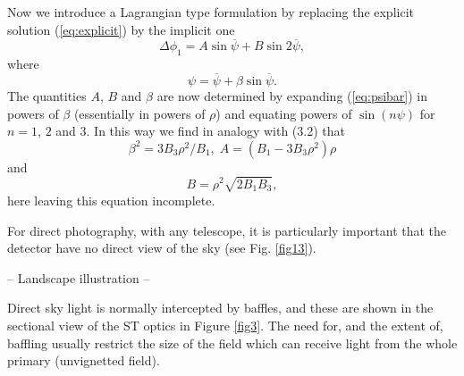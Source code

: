 Now we introduce a Lagrangian type formulation by replacing the
explicit solution (\ref{eq:explicit}) by the implicit one
\begin{equation}
\Delta \phi_1 = A \sin \overline{\psi} + B \sin 2 \overline{\psi},
\end{equation}
where
\begin{equation}
 \psi = \overline{\psi} + \beta \sin \overline{\psi}.
 \label{eq:psibar}
\end{equation}
The quantities $A$, $B$ and $\beta$ are now determined
by expanding (\ref{eq:psibar})
in powers of $\beta$ (essentially in powers of
$\rho$) and equating powers of $\sin (n \psi)$ for
$n = 1$, $2$ and $3$. In this way we find in analogy
with (3.2) that
\begin{displaymath}
\beta^2 = 3 B_3 \rho^2/B_1, \; A = (B_1 - 3 B_3\rho^2)\rho
\end{displaymath}
and
\begin{displaymath}
B = \rho^2 \sqrt{2 B_1 B_3},
\end{displaymath}
here leaving this equation incomplete.

For direct photography, with any telescope, it is particularly
important that the detector have no direct view of the sky (see
Fig. \ref{fig13}).
\setcounter{figure}{12}
\begin{figure*}
 \vspace{200pt}
 -- Landscape illustration --
 \vspace{200pt}
 \caption{Chart for a cold fully ionized, loss free proton plasma with
          \protect $\omega_0/\omega_{\rm H} = 2.0\protect $.
 The upper and lower strips refer to the Ordinary and Extraordinary
  waves respectively, and the shaded parts show where these waves are
  cut off (evanescent) for all real wave normal and ray directions.
 The transition frequencies marked at the top are explained in the text.
 The  frequency scale is divided into sections and is linear in each section.
 The horizontal lines show the frequency ranges where the various
  features of the field, as indicated at the left, are present.
 The numbers above and below them give the values in degrees of
  $\alpha$ and $\theta$, respectively, at the ends of the ranges.}
 \label{fig13}
\end{figure*}
Direct sky light is normally intercepted by baffles,
and these are shown in the sectional view of the ST optics in Figure
\ref{fig3}. The need for, and the extent of, baffling usually restrict the
size of the field which can receive light from the whole primary
(unvignetted field).

